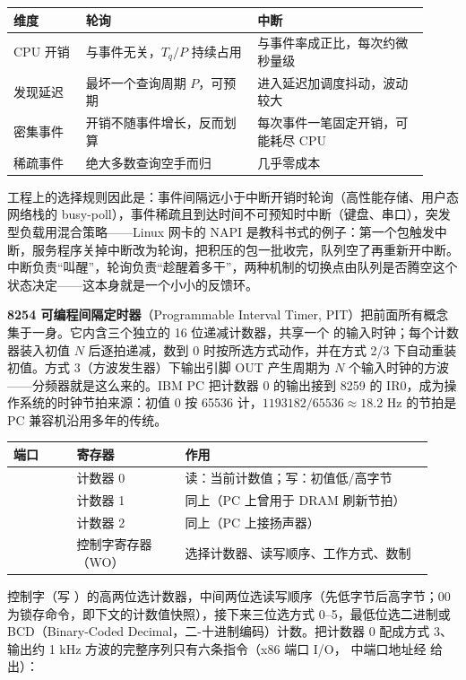 \begin{longtable}{L{0.16\linewidth}L{0.38\linewidth}L{0.38\linewidth}}
\toprule
维度 & 轮询 & 中断 \\
\midrule
CPU 开销 & 与事件无关，$T_q/P$ 持续占用 & 与事件率成正比，每次约微秒量级 \\\tablerowrule
发现延迟 & 最坏一个查询周期 $P$，可预期 & 进入延迟加调度抖动，波动较大 \\\tablerowrule
密集事件 & 开销不随事件增长，反而划算 & 每次事件一笔固定开销，可能耗尽 CPU \\\tablerowrule
稀疏事件 & 绝大多数查询空手而归 & 几乎零成本 \\
\bottomrule
\end{longtable}

工程上的选择规则因此是：事件间隔远小于中断开销时轮询（高性能存储、用户态网络栈的 busy-poll），事件稀疏且到达时间不可预知时中断（键盘、串口），突发型负载用混合策略——Linux 网卡的 NAPI 是教科书式的例子：第一个包触发中断，服务程序关掉中断改为轮询，把积压的包一批收完，队列空了再重新开中断。中断负责“叫醒”，轮询负责“趁醒着多干”，两种机制的切换点由队列是否腾空这个状态决定——这本身就是一个小小的反馈环。


\textbf{8254 可编程间隔定时器}（Programmable Interval Timer, PIT）把前面所有概念集于一身。它内含三个独立的 16 位递减计数器，共享一个  的输入时钟；每个计数器装入初值 $N$ 后逐拍递减，数到 0 时按所选方式动作，并在方式 2/3 下自动重装初值。方式 3（方波发生器）下输出引脚 OUT 产生周期为 $N$ 个输入时钟的方波——分频器就是这么来的。IBM PC 把计数器 0 的输出接到 8259 的 IR0，成为操作系统的时钟节拍来源：初值 0 按 65536 计，$1193182/65536 \approx 18.2$ Hz 的节拍是 PC 兼容机沿用多年的传统。

\begin{longtable}{L{0.14\linewidth}L{0.24\linewidth}L{0.55\linewidth}}
\toprule
端口 & 寄存器 & 作用 \\
\midrule
{} & 计数器 0 & 读：当前计数值；写：初值低/高字节 \\\tablerowrule
{} & 计数器 1 & 同上（PC 上曾用于 DRAM 刷新节拍） \\\tablerowrule
{} & 计数器 2 & 同上（PC 上接扬声器） \\\tablerowrule
{} & 控制字寄存器（WO） & 选择计数器、读写顺序、工作方式、数制 \\
\bottomrule
\end{longtable}

控制字（写 ）的高两位选计数器，中间两位选读写顺序（先低字节后高字节；00 为锁存命令，即下文的计数值快照），接下来三位选方式 0--5，最低位选二进制或 BCD（Binary-Coded Decimal，二-十进制编码）计数。把计数器 0 配成方式 3、输出约 1 kHz 方波的完整序列只有六条指令（x86 端口 I/O， 中端口地址经  给出）：

